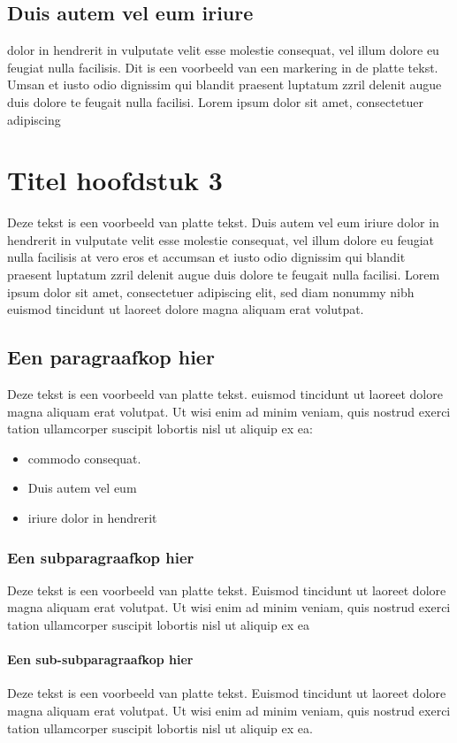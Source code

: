 \documentclass[dutch]{uureport}
\begin{document}
\section{Duis autem vel eum iriure}

dolor in hendrerit in vulputate velit esse molestie consequat, vel
illum dolore eu feugiat nulla facilisis. Dit is een voorbeeld van een
markering in de platte tekst. Umsan et iusto odio dignissim qui
blandit praesent luptatum zzril delenit augue duis dolore te feugait
nulla facilisi. Lorem ipsum dolor sit amet, consectetuer adipiscing

\chapter{Titel hoofdstuk 3}

Deze tekst is een voorbeeld van platte tekst. Duis autem vel eum
iriure dolor in hendrerit in vulputate velit esse molestie consequat,
vel illum dolore eu feugiat nulla facilisis at vero eros et accumsan
et iusto odio dignissim qui blandit praesent luptatum zzril delenit
augue duis dolore te feugait nulla facilisi. Lorem ipsum dolor sit
amet, consectetuer adipiscing elit, sed diam nonummy nibh euismod tincidunt ut laoreet dolore magna aliquam erat volutpat.

\section{Een paragraafkop hier}

Deze tekst is een voorbeeld van platte tekst. euismod tincidunt ut laoreet dolore magna aliquam erat volutpat. Ut wisi enim ad minim veniam, quis nostrud exerci tation ullamcorper suscipit lobortis nisl ut aliquip ex ea:
\begin{itemize}
  \item	commodo consequat.
  \item	Duis autem vel eum 
  \item	iriure dolor in hendrerit
\end{itemize}

\subsection{Een subparagraafkop hier}

Deze tekst is een voorbeeld van platte tekst. Euismod tincidunt ut laoreet dolore magna aliquam erat volutpat. Ut wisi enim ad minim veniam, quis nostrud exerci tation ullamcorper suscipit lobortis nisl ut aliquip ex ea

\subsubsection{Een sub-subparagraafkop hier}

Deze tekst is een voorbeeld van platte tekst. Euismod tincidunt ut laoreet dolore magna aliquam erat volutpat. Ut wisi enim ad minim veniam, quis nostrud exerci tation ullamcorper suscipit lobortis nisl ut aliquip ex ea.
\end{document}
